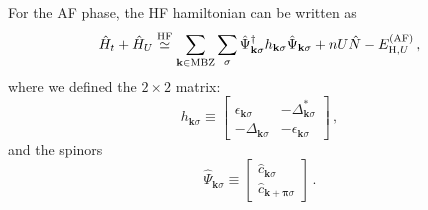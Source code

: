 For the AF phase, the HF hamiltonian can be written as
\begin{equation}\label{eq:af-HM-hk}
	\hat H_t + \hat H_U \stackrel{\mathrm{HF}}{\simeq} \sum_{\mathbf{k} \in \mathrm{MBZ}} \sum_\sigma \hat \Psi_{\mathbf{k}\sigma}^\dagger h_{\mathbf{k}\sigma} \hat \Psi_{\mathbf{k}\sigma} + nU \hat N -  E_{\mathrm{H},U}^{(\mathrm{AF})} \, ,
\end{equation}
where we defined the $2 \times 2$ matrix:
\begin{equation}\label{eq:af-hk}
	h_{\mathbf{k}\sigma} \equiv \begin{bmatrix}
		\epsilon_{\mathbf{k}\sigma} & -\Delta_{\mathbf{k}\sigma}^* \\
		-\Delta_{\mathbf{k}\sigma} & - \epsilon_{\mathbf{k}\sigma}
	\end{bmatrix} \, ,
\end{equation}
and the spinors
\begin{equation}\label{eq:af-Psi-def}
	\hat \Psi_{\mathbf{k}\sigma} \equiv \begin{bmatrix}
		\hat c_{\mathbf{k}\sigma} \\
		\hat c_{\mathbf{k}+\bm{\pi}\sigma} 
	\end{bmatrix} \, .
\end{equation}


